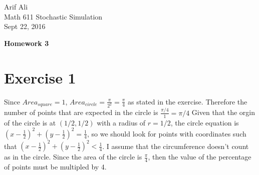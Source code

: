 \documentclass{article}\usepackage[]{graphicx}\usepackage[]{color}
\begin{document}
\begin{flushright}
Arif Ali\\
Math 611 Stochastic Simulation\\
Sept 22, 2016\\
\end{flushright}

\begin{center}
\LARGE\textbf{Homework 3}
  \end{center}
\section*{Exercise 1}
Since $Area_{square}=1$, $Area_{circle}=\frac{\pi}{2^2}=\frac{\pi}{4}$ as stated in the exercise. Therefore the number of points that are expected in the circle is $\frac{\pi/4}{1}= \pi/4$ Given that the orgin of the circle is at $(1/2,1/2)$ with a radius of $r=1/2$, the circle equation is $(x-\frac{1}{2})^2+(y-\frac{1}{2})^2=\frac{1}{4}$, so we should look for points with coordinates such that $(x-\frac{1}{2})^2+(y-\frac{1}{2})^2<\frac{1}{4}$. I assume that the circumference doesn't count as in the circle. Since the area of the circle is $\frac{\pi}{4}$, then the value of the percentage of points must be multipled by 4.
\end{document}

